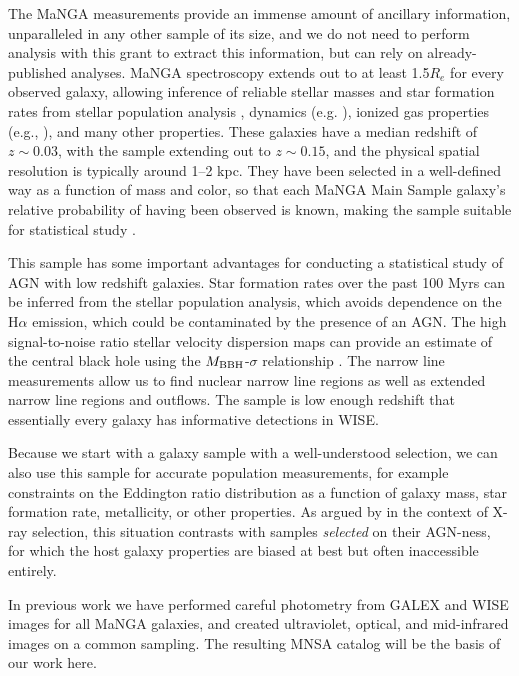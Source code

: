 \documentclass[12pt, preprint]{hacked-aastex}
\begin{document}
The MaNGA measurements provide an immense amount of ancillary information,
unparalleled in any other sample of its size, and we do not need to perform
analysis with this grant to extract this information, but can rely on
already-published analyses.
MaNGA spectroscopy extends out to at least 1.5$R_e$ for every observed galaxy, 
allowing inference of reliable stellar masses and star formation rates
from stellar population analysis \cite{sanchez22a}, dynamics (e.g. \cite{graham18a}), ionized
gas properties (e.g., \cite{belfiore17a}), and many other properties. 
These  galaxies have a median redshift of $z\sim0.03$, with the sample extending
out to $z\sim 0.15$, and the physical spatial resolution
is typically around 1--2 kpc. They have been selected in a well-defined
way as a function of mass and color, so that each MaNGA Main Sample
galaxy's relative probability of having been observed is known,
making the sample suitable for statistical study \cite{wake17a}.

This sample has some important advantages for conducting a 
statistical study of AGN with low redshift galaxies.
Star formation rates over the past 100 Myrs can be inferred from the stellar
population analysis, which avoids dependence on the H$\alpha$ emission,
which could be contaminated by the presence of an AGN.
The high signal-to-noise ratio stellar velocity dispersion maps  can provide 
an estimate of the central black hole using the $M_{\rm BBH}$-$\sigma$ 
relationship \cite{kormendy04b}. The narrow line measurements allow us to 
find nuclear narrow line regions as well as extended narrow line regions
and outflows. The sample is low enough redshift that essentially
every galaxy has informative detections in WISE.

Because we start with a galaxy sample with a well-understood selection,
we can also use this sample for accurate population measurements, for example
constraints on the Eddington ratio distribution as a function of galaxy
mass, star formation rate, metallicity, or other properties.
As argued by \cite{aird12a} in the context of X-ray selection, this situation 
contrasts  with samples {\it selected} on their AGN-ness, for which the host 
galaxy properties are biased at best but often inaccessible entirely. 

In previous work we have performed careful photometry from GALEX
and WISE images for all MaNGA galaxies, and created ultraviolet, optical, 
and mid-infrared images on a common sampling. The resulting MNSA catalog
will be the basis of our work here.
\end{document}
